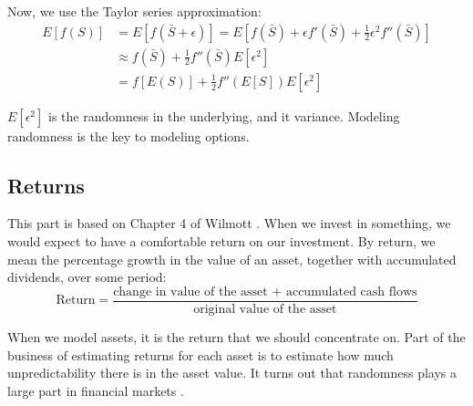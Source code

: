\begin{center}
\begin{footnotesize}
{\begin{minipage}{0.90\textwidth}
Now, we use the Taylor series approximation:
\begin{align}
    E \left[ f \left( S \right) \right] & = E \left[ f \! \left( \bar{S} + \epsilon \right) \right] = E \left[ f \! \left( \bar{S} \right) + \epsilon f' \! \left( \bar{S} \right) + \frac{1}{2} \epsilon^2 f'' \! \left( \bar{S} \right) \right] \\
    & \approx f \! \left( \bar{S} \right) + \frac{1}{2} f'' \! \left( \bar{S} \right) E \left[ \epsilon^2 \right] \\
    & = f \! \left[ E \left( S \right) \right] + \frac{1}{2} f'' \! \left( E \left[ S \right] \right) E \left[ \epsilon^2 \right]
\end{align}

$E \left[ \epsilon^2 \right]$ is the randomness in the underlying, and it variance. Modeling randomness is the key to modeling options.
\end{minipage}
}
\end{footnotesize}
\end{center}


\subsection{Returns}
This part is based on Chapter 4 of Wilmott \cite{pw_iqf2ed_2007}. When we invest in something, we would expect to have a comfortable return on our investment. By return, we mean the percentage growth in the value of an asset, together with accumulated dividends, over some period:
\begin{equation}
    \text{Return} = \frac{\text{change in value of the asset + accumulated cash flows}}{\text{original value of the asset}}
\end{equation}

When we model assets, it is the return that we should concentrate on. Part of the business of estimating returns for each asset is to estimate how much unpredictability there is in the asset value. It turns out that randomness plays a large part in financial markets \cite{pw_iqf2ed_2007}.

